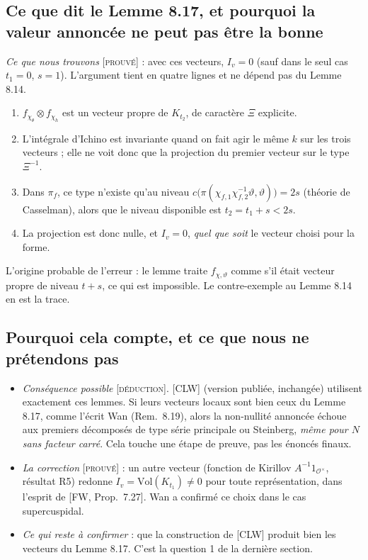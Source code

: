 \documentclass[11pt]{amsart}
\newcommand{\cO}{\mathcal{O}}
\newcommand{\stat}[1]{\textsc{[#1]}}
\newcommand{\Vol}{\mathrm{Vol}}
\begin{document}
\subsection*{Ce que dit le Lemme 8.17, et pourquoi la valeur annoncée ne peut pas être la bonne}
\emph{Ce que nous trouvons} \stat{prouvé} : avec ces vecteurs, $I_v=0$ (sauf dans le seul cas $t_1=0$, $s=1$). L'argument tient en quatre lignes et ne dépend pas du Lemme 8.14.
\begin{enumerate}[label=(\roman*)]
\item $f_{\chi_\theta}\otimes f_{\chi_h}$ est un vecteur propre de $K_{t_2}$, de caractère $\Xi$ explicite.
\item L'intégrale d'Ichino est invariante quand on fait agir le même $k$ sur les trois vecteurs ; elle ne voit donc que la projection du premier vecteur sur le type $\Xi^{-1}$.
\item Dans $\pi_f$, ce type n'existe qu'au niveau $c\big(\pi(\chi_{f,1}\chi_{f,2}^{-1}\vartheta,\vartheta)\big)=2s$ (théorie de Casselman), alors que le niveau disponible est $t_2=t_1+s<2s$.
\item La projection est donc nulle, et $I_v=0$, \emph{quel que soit} le vecteur choisi pour la forme.
\end{enumerate}
L'origine probable de l'erreur : le lemme traite $f_{\chi,\vartheta}$ comme s'il était vecteur propre de niveau $t+s$, ce qui est impossible. Le contre-exemple au Lemme 8.14 en est la trace.

\subsection*{Pourquoi cela compte, et ce que nous ne prétendons pas}
\begin{itemize}
\item \emph{Conséquence possible} \stat{déduction}. [CLW] (version publiée, inchangée) utilisent exactement ces lemmes. Si leurs vecteurs locaux sont bien ceux du Lemme 8.17, comme l'écrit Wan (Rem.~8.19), alors la non-nullité annoncée échoue aux premiers décomposés de type série principale ou Steinberg, \emph{même pour $N$ sans facteur carré}. Cela touche une étape de preuve, pas les énoncés finaux.
\item \emph{La correction} \stat{prouvé} : un autre vecteur (fonction de Kirillov $A^{-1}1_{\cO^\times}$, résultat R5) redonne $I_v=\Vol(K_{t_1})\neq0$ pour toute représentation, dans l'esprit de [FW, Prop.~7.27]. Wan a confirmé ce choix dans le cas supercuspidal.
\item \emph{Ce qui reste à confirmer} : que la construction de [CLW] produit bien les vecteurs du Lemme 8.17. C'est la question 1 de la dernière section.
\end{itemize}
\end{document}

